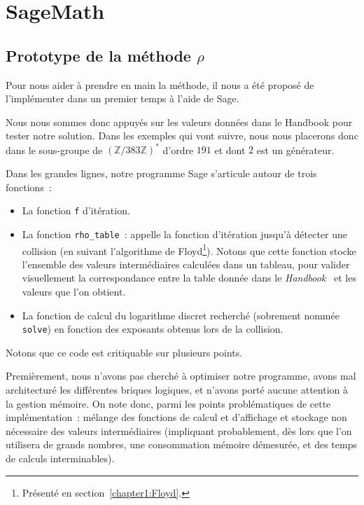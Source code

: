     \section{SageMath}
        \subsection{Prototype de la méthode \texorpdfstring{$\rho$}{Rho}}
        Pour nous aider à prendre en main la méthode, il nous a été proposé de l'implémenter dans un premier temps à l'aide de Sage.

        Nous nous sommes donc appuyés sur les valeurs données dans le Handbook pour tester notre solution.
        Dans les exemples qui vont suivre, nous nous placerons donc dans le sous-groupe de ${(\mathbb{Z}/383\mathbb{Z})}^*$ d'ordre $191$ et dont $2$ est un générateur.

        Dans les grandes lignes, notre programme Sage s'articule autour de trois fonctions~:
        \begin{itemize}
            \item La fonction \lstinline{f} d'itération.
            \item La fonction \lstinline{rho_table}~: appelle la fonction d'itération jusqu'à détecter une collision (en suivant l'algorithme de Floyd\footnote{Présenté en section~\ref{chapter1:Floyd}.}). Notons que cette fonction stocke l'ensemble des valeurs intermédiaires calculées dans un tableau, pour valider visuellement la correspondance entre la table donnée dans le \textit{Handbook}~\autocite[107]{handbook} et les valeurs que l'on obtient.
            \item La fonction de calcul du logarithme discret recherché (sobrement nommée \lstinline{solve}) en fonction des exposants obtenus lors de la collision.
        \end{itemize}

        Notons que ce code est critiquable sur plusieurs points.

        Premièrement, nous n'avons pas cherché à optimiser notre programme, avons mal architecturé les différentes briques logiques, et n'avons porté aucune attention à la gestion mémoire.
        On note donc, parmi les points problématiques de cette implémentation~: mélange des fonctions de calcul et d'affichage et stockage non nécessaire des valeurs intermédiaires (impliquant probablement, dès lors que l'on utilisera de grands nombres, une consommation mémoire démesurée, et des temps de calculs interminables).

